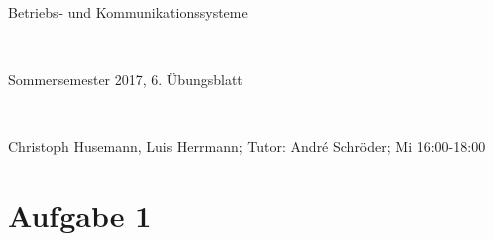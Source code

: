 \documentclass[numbers=noendperiod]{scrartcl}
\begin{document}
	
	\setlength{\parindent}{0em} 
	
	\newcommand{\inputmintedframed}[2]{
		\begin{mdframed}[linecolor=bg,backgroundcolor=bg]
			\inputminted[mathescape,breaklines,linenos,numbersep=5pt,tabsize=3]{#1}{#2}
	\end{mdframed}}
	
	\hrulefill
	\begin{center}
		\bfseries %
		\sffamily %
		\begin{huge}
			Betriebs- und Kommunikationssysteme
		\end{huge}\\
		\begin{Large}
			Sommersemester 2017, 6. Übungsblatt
		\end{Large}\\
		\begin{small}
			Christoph Husemann, Luis Herrmann; Tutor: André Schröder; Mi 16:00-18:00
		\end{small}
		
		\vspace{-10pt}
	\end{center}
	\hrulefill
	
\section*{Aufgabe 1}
\end{document}
